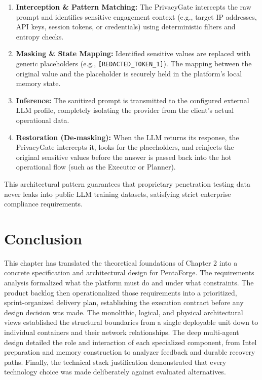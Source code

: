 \documentclass[12pt,a4paper]{report}
\begin{document}
\begin{enumerate}
    \item \textbf{Interception \& Pattern Matching:} The PrivacyGate intercepts the
    raw prompt and identifies sensitive engagement context (e.g., target IP addresses,
    API keys, session tokens, or credentials) using deterministic filters and entropy
    checks.
    \item \textbf{Masking \& State Mapping:} Identified sensitive values are replaced
    with generic placeholders (e.g., \texttt{[REDACTED\_TOKEN\_1]}). The mapping
    between the original value and the placeholder is securely held in the platform's
    local memory state.
    \item \textbf{Inference:} The sanitized prompt is transmitted to the configured
    external LLM profile, completely isolating the provider from the client's actual
    operational data.
    \item \textbf{Restoration (De-masking):} When the LLM returns its response, the
    PrivacyGate intercepts it, looks for the placeholders, and reinjects the original
    sensitive values before the answer is passed back into the hot operational flow
    (such as the Executor or Planner).
\end{enumerate}

This architectural pattern guarantees that proprietary penetration testing data
never leaks into public LLM training datasets, satisfying strict enterprise
compliance requirements.

\section{Conclusion}

This chapter has translated the theoretical foundations of Chapter 2 into a
concrete specification and architectural design for PentaForge. The requirements
analysis formalized what the platform must do and under what constraints. The
product backlog then operationalized those requirements into a prioritized,
sprint-organized delivery plan, establishing the execution contract before any
design decision was made. The monolithic, logical, and physical architectural views established the structural boundaries from a single deployable unit down to individual containers and their network relationships. The deep
multi-agent design detailed the role and interaction of each specialized
component, from Intel preparation and memory construction to analyzer feedback
and durable recovery paths. Finally, the technical stack justification
demonstrated that every technology choice was made deliberately against evaluated
alternatives.
\end{document}
